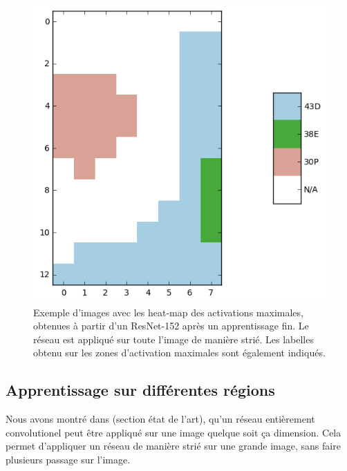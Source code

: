 \begin{figure}
\begin{minipage}[c]{.33\linewidth}
  \end{minipage} \hfill
  \begin{minipage}[c]{.32\linewidth}
    \includegraphics[width=\linewidth]{figures/sample3_labels.png}
  \end{minipage}


	\caption{Exemple d'images avec les heat-map des activations maximales, obtenues à partir d'un ResNet-152 après un apprentissage fin. Le réseau est appliqué sur toute l'image de manière strié. Les labelles obtenu sur les zones d'activation maximales sont également indiqués.\label{fig:heatmaps}}
	
\end{figure}



\subsection{Apprentissage sur différentes régions}

Nous avons montré dans (section état de l'art), qu'un réseau entièrement convolutionel peut être appliqué sur une image quelque soit ça dimension. Cela permet d'appliquer un réseau de manière strié sur une grande image, sans faire plusieurs passage sur l'image.

